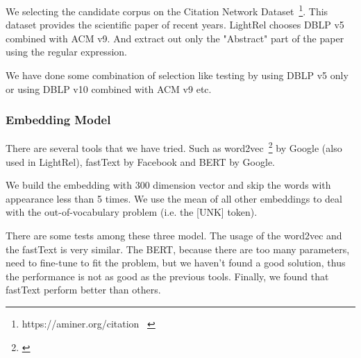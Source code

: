 We selecting the candidate corpus on the Citation Network Dataset~\footnote{https://aminer.org/citation ~\cite{Tang:08KDD}}. This dataset provides the scientific paper of recent years. LightRel chooses DBLP  v5 combined with ACM v9. And extract out only the "Abstract" part of the paper using the regular expression.

We have done some combination of selection like testing by using DBLP v5 only or using DBLP v10 combined with ACM v9 etc.

\subsubsection{Embedding Model}
\label{sec:embedding_model}

There are several tools that we have tried. Such as word2vec~\footnote{\cite{NIPS2013_5021}} by Google (also used in LightRel), fastText by Facebook and BERT by Google.

We build the embedding with 300 dimension vector and skip the words with appearance less than 5 times. We use the mean of all other embeddings to deal with the out-of-vocabulary problem (i.e. the [UNK] token).

There are some tests among these three model. The usage of the word2vec and the fastText is very similar. The BERT, because there are too many parameters, need to fine-tune to fit the problem, but we haven't found a good solution, thus the performance is not as good as the previous tools. Finally, we found that fastText perform better than others.